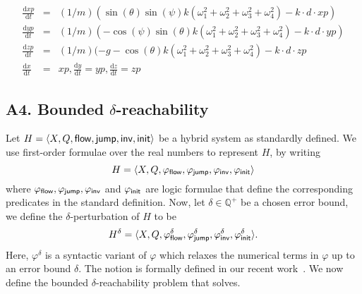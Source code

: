 {\begin{eqnarray*}
\frac{\mathrm{d}{xp}}{\mathrm{d}t} &=& (1/m)(\sin(\theta)\sin(\psi)k(\omega_1^2 + \omega_2^2 +\omega_3^2+\omega_4^2) - k\cdot d\cdot{xp})\\
\frac{\mathrm{d}{yp}}{\mathrm{d}t} &=& (1/m)(-\cos(\psi)\sin(\theta)k(\omega_1^2 + \omega_2^2 +\omega_3^2+\omega_4^2) - k\cdot d\cdot{yp})\\
\frac{\mathrm{d}{zp}}{\mathrm{d}t} &=& (1/m)(-g-\cos(\theta)k(\omega_1^2 + \omega_2^2 +\omega_3^2+\omega_4^2) - k\cdot d\cdot{zp}\\
\frac{\mathrm{d}x}{\mathrm{d}t} &=& {xp}, \frac{\mathrm{d}y}{\mathrm{d}t} = {yp}, \frac{\mathrm{d}z}{\mathrm{d}t} = {zp}
\end{eqnarray*}

\subsection*{A4. Bounded $\delta$-reachability}\label{sec:delta-reachability}
Let $H = \langle X, Q, \mathsf{flow}, \mathsf{jump}, \mathsf{inv}, \mathsf{init}\rangle$ be a hybrid
system as standardly defined. We use first-order formulae over the
real numbers to represent $H$, by writing $$H = \langle X, Q,
\varphi_{\mathsf{flow}}, \varphi_{\mathsf{jump}}, \varphi_{\mathsf{inv}},
\varphi_{\mathsf{init}}\rangle$$ where $\varphi_{\mathsf{flow}}, \varphi_{\mathsf{jump}},
\varphi_{\mathsf{inv}}$ and $\varphi_{\mathsf{init}}$ are logic formulae that define
the corresponding predicates in the standard definition. Now, let
$\delta\in \mathbb{Q}^+$ be a chosen error bound, we define the
$\delta$-perturbation of $H$ to be $$H^{\delta} = \langle X, Q,
\varphi_{\mathsf{flow}}^{\delta}, \varphi_{\mathsf{jump}}^{\delta},
\varphi_{\mathsf{inv}}^{\delta}, \varphi_{\mathsf{init}}^{\delta}\rangle.$$ Here,
$\varphi^{\delta}$ is a syntactic variant of $\varphi$ which relaxes
the numerical terms in $\varphi$ up to an error bound $\delta$. The
notion is formally defined in our recent
work~\cite{DBLP:conf/lics/GaoAC12,DBLP:conf/cade/GaoAC12,DBLP:journals/corr/GaoKCC14}.
We now define the bounded $\delta$-reachability problem that \dReach{}
solves.

}
